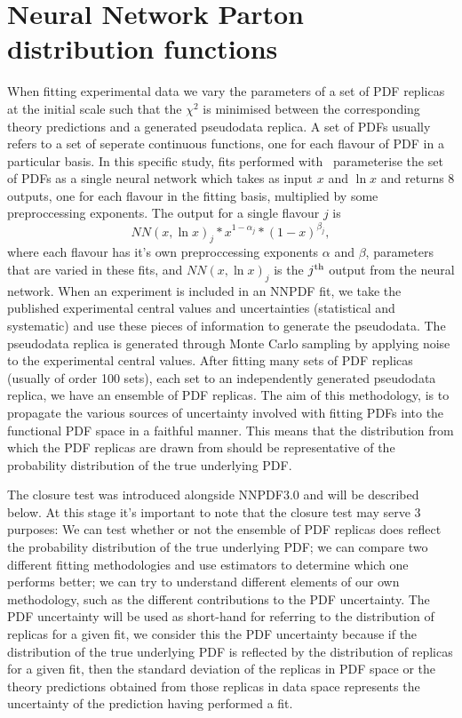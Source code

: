 \section{Neural Network Parton distribution functions}
When fitting experimental data we vary the parameters of a set of PDF replicas
at the initial scale such that the $\chi^2$ is minimised between the
corresponding theory predictions and a generated pseudodata replica. A set of
PDFs usually refers to a set of seperate continuous functions, one for each
flavour of PDF in a particular basis. In this specific study, fits performed
with \nfit\ parameterise the set of PDFs as a single neural network which takes
as input $x$ and $\ln x$ and returns 8 outputs, one for each flavour in the
fitting basis, multiplied by some preproccessing exponents. The output for a
single flavour $j$ is
\begin{equation}
    NN(x, \ln x)_j * x^{1-\alpha_j} * (1-x)^{\beta_j},
\end{equation}
where each flavour has it's own preproccessing exponents $\alpha$ and $\beta$,
parameters that are varied in these fits, and $NN(x, \ln x)_j$ is the
$j^{\rm th}$ output from the neural network.
When an experiment is included in an NNPDF fit, we take the published
experimental central values and uncertainties (statistical and systematic)
and use these pieces of information to generate the pseudodata.
The pseudodata replica is generated
through Monte Carlo sampling by applying noise to the experimental
central values.
After fitting many sets of PDF replicas (usually of order 100 sets),
each set to an independently generated pseudodata replica, we have an ensemble of
PDF replicas.
The aim of this methodology, is to propagate the various sources of
uncertainty involved with fitting PDFs into the functional PDF space in a faithful
manner. This means that the distribution from which the PDF replicas are drawn
from should be representative of the probability distribution of the true
underlying PDF.

The closure test was introduced alongside NNPDF3.0 and will be described below.
At this stage it's important to note that the closure test may serve 3 purposes:
We can test whether or not the ensemble of PDF replicas does reflect the
probability distribution of the true underlying PDF; we can compare two different
fitting methodologies and use estimators to determine which one performs better;
we can try to understand different elements of our own methodology, such as
the different contributions to the PDF uncertainty. The PDF uncertainty will
be used as short-hand for referring to the distribution of replicas for a given
fit, we consider this the PDF uncertainty because if the distribution
of the true underlying PDF is reflected by the distribution of replicas for
a given fit, then the standard deviation of the replicas in PDF space or the
theory predictions obtained from those replicas in data space represents
the uncertainty of the prediction having performed a fit.

